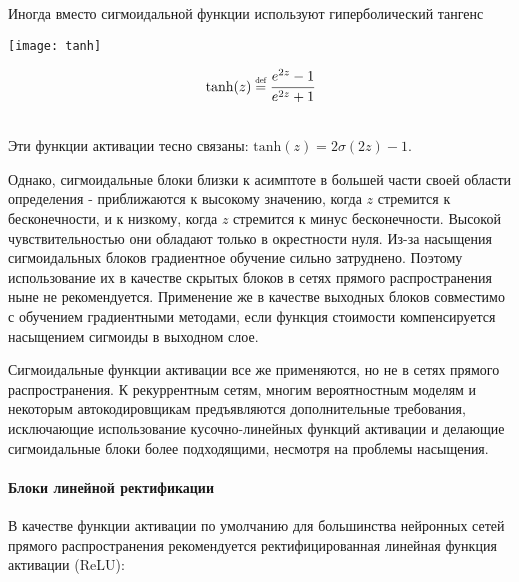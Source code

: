 Иногда вместо сигмоидальной функции используют гиперболический тангенс\\ 

\begin{minipage}{0.4\textwidth}
    \texttt{[image: tanh]}
    \label{fig:tanh}
\end{minipage}
\hspace{30pt}
\begin{minipage}{0.3\textwidth}
    \begin{equation*}
        \text{tanh}(z) \defeq \cfrac{e^{2z} - 1}{e^{2z} + 1}
    \end{equation*}
\end{minipage}\\

Эти функции активации тесно связаны: $\text{tanh}(z) = 2 \sigma(2z) - 1$.

Однако, сигмоидальные блоки близки к асимптоте в большей части своей области определения -
приближаются к высокому значению, когда $z$ стремится к бесконечности, и к низкому,
когда $z$ стремится к минус бесконечности. Высокой чувствительностью они обладают 
только в окрестности нуля. Из-за насыщения сигмоидальных блоков градиентное
обучение сильно затруднено. Поэтому использование их в качестве скрытых блоков
в сетях прямого распространения ныне не рекомендуется. Применение же в качестве
выходных блоков совместимо с обучением градиентными методами, если функция
стоимости компенсируется насыщением сигмоиды в выходном слое.

Сигмоидальные функции активации все же применяются, но не в сетях прямого
распространения. К рекуррентным сетям, многим вероятностным моделям и некоторым 
автокодировщикам предъявляются дополнительные требования, исключающие
использование кусочно-линейных функций активации и делающие сигмоидальные
блоки более подходящими, несмотря на проблемы насыщения.

\paragraph{Блоки линейной ректификации}

В качестве функции активации по умолчанию для большинства нейронных сетей прямого 
распространения рекомендуется ректифицированная линейная функция активации (ReLU):

